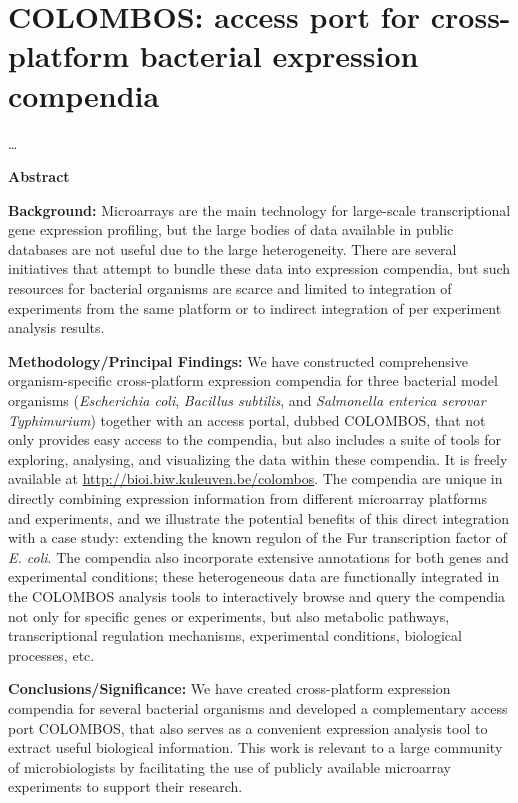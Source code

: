 \chapter{COLOMBOS: access port for cross-platform bacterial expression compendia}\label{ch:colombos}

\ldots

\instructionsintroduction

\textbf{Abstract}

\textbf{Background:} Microarrays are the main technology for large-scale 
transcriptional gene expression profiling, but the large bodies of data 
available in public databases are not useful due to the large heterogeneity. 
There are several initiatives that attempt to bundle these data into expression 
compendia, but such resources for bacterial organisms are scarce and limited to 
integration of experiments from the same platform or to indirect integration of 
per experiment analysis results.

\textbf{Methodology/Principal Findings:} We have constructed comprehensive 
organism-specific cross-platform expression compendia for three bacterial model 
organisms ({\it Escherichia coli}, {\it Bacillus subtilis}, and {\it Salmonella 
enterica serovar Typhimurium}) together with an access portal, dubbed COLOMBOS, 
that not only provides easy access to the compendia, but also includes a suite 
of tools for exploring, analysing, and visualizing the data within these 
compendia. It is freely available at 
\url{http://bioi.biw.kuleuven.be/colombos}. The compendia are unique in 
directly combining expression information from different microarray platforms 
and experiments, and we illustrate the potential benefits of this direct 
integration with a case study: extending the known regulon of the Fur 
transcription factor of {\it E. coli}. The compendia also incorporate extensive 
annotations for both genes and experimental conditions; these heterogeneous 
data are functionally integrated in the COLOMBOS analysis tools to 
interactively browse and query the compendia not only for specific genes or 
experiments, but also metabolic pathways, transcriptional regulation 
mechanisms, experimental conditions, biological processes, etc.

\textbf{Conclusions/Significance:} We have created cross-platform expression 
compendia for several bacterial organisms and developed a complementary access 
port COLOMBOS, that also serves as a convenient expression analysis tool to 
extract useful biological information. This work is relevant to a large 
community of microbiologists by facilitating the use of publicly available 
microarray experiments to support their research.



